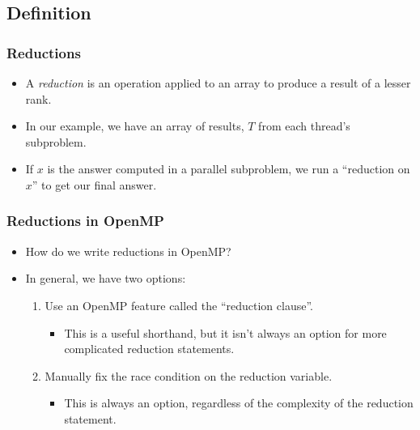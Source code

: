 \documentclass[table]{beamer}
\begin{document}
\subsection{Definition}
\begin{frame}
    \frametitle{Reductions}
    \begin{definition}
        \begin{itemize}
            \item<1-> A \emph{reduction} is an operation applied to an
            array to produce a result of a lesser rank.
            \item<2-> In our example, we have an array of results, $T$ from
            each thread's subproblem.
            \item<3-> If $x$ is the answer computed in a parallel subproblem, 
            we run a ``reduction on $x$'' to get our final answer.
        \end{itemize}
    \end{definition}
\end{frame}

\begin{frame}
    \frametitle{Reductions in OpenMP}
    \begin{itemize}
        \item<1-> How do we write reductions in OpenMP?
        \item<2-> In general, we have two options:
        \begin{enumerate}
            \item<3-> Use an OpenMP feature called the ``reduction 
            clause''.
            \begin{itemize}
                \item<4-> This is a useful shorthand, but it isn't always 
                an option for more complicated reduction statements.
            \end{itemize}
            \item<5-> Manually fix the race condition on the reduction 
            variable.
            \begin{itemize}
                \item<6-> This is always an option, regardless of the 
                complexity of the reduction statement.
            \end{itemize}
        \end{enumerate}
    \end{itemize}
\end{frame}
\end{document}
